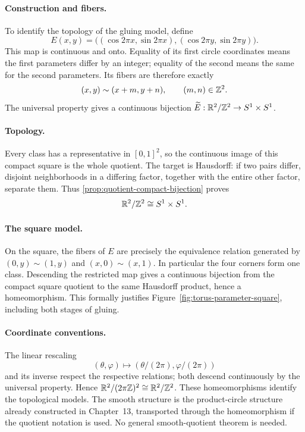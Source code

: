 \paragraph{Construction and fibers.}
To identify the topology of the gluing model, define
\[
E(x,y)=\big((\cos2\pi x,\sin2\pi x),
                 (\cos2\pi y,\sin2\pi y)\big).
\]
This map is continuous and onto. Equality of its first circle coordinates
means the first parameters differ by an integer; equality of the second
means the same for the second parameters. Its fibers are therefore exactly
\[
(x,y)\sim(x+m,y+n),\qquad (m,n)\in\mathbb{Z}^2.
\]
The universal property gives a continuous bijection
$\widetilde E:\mathbb{R}^2/\mathbb{Z}^2\to S^1\times S^1$.
\paragraph{Topology.}
Every class has a representative in $[0,1]^2$, so the continuous image of
this compact square is the whole quotient. The target is Hausdorff:
if two pairs differ, disjoint neighborhoods in a differing factor,
together with the entire other factor, separate them. Thus
\cref{prop:quotient-compact-bijection} proves
\[
\mathbb{R}^2/\mathbb{Z}^2\cong S^1\times S^1.
\]
\paragraph{The square model.}
On the square, the fibers of $E$ are precisely the equivalence relation
generated by $(0,y)\sim(1,y)$ and $(x,0)\sim(x,1)$.
In particular the four corners form one class. Descending the restricted
map gives a continuous bijection from the compact square quotient to the
same Hausdorff product, hence a homeomorphism. This formally justifies
Figure~\ref{fig:torus-parameter-square}, including both stages of gluing.


\FloatBarrier

\paragraph{Coordinate conventions.}
The linear rescaling
\[
(\theta,\varphi)\mapsto
(\theta/(2\pi),\varphi/(2\pi))
\]
 and its inverse respect the respective
relations; both descend continuously by the universal property. Hence
$\mathbb{R}^2/(2\pi\mathbb{Z})^2\cong\mathbb{R}^2/\mathbb{Z}^2$.
These homeomorphisms identify the topological models. The smooth structure
is the product-circle structure already constructed in Chapter~13,
transported through the homeomorphism if the quotient notation is used.
No general smooth-quotient theorem is needed.


